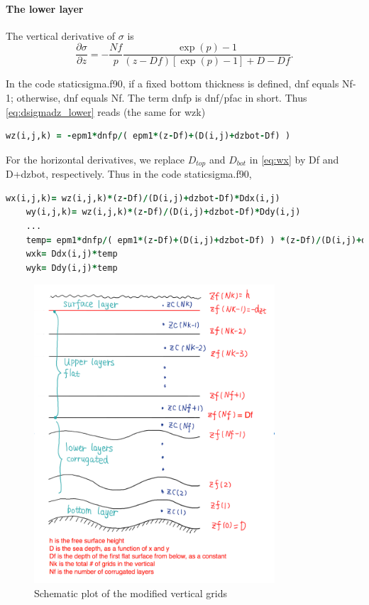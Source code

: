 \documentclass[12pt,letterpaper,titlepage]{article}
\newcommand{\Blue}[1]{{\color{blue}#1}}
\begin{document}
\paragraph{The lower layer}
The vertical derivative of $\sigma$ is
\begin{equation}
\frac{\partial \sigma}{\partial z} =-\frac{Nf}{p}\frac{\exp(p)-1}{(z-Df)[\exp(p)-1]+D-Df}. \label{eq:dsigmadz_lower}
\end{equation}

In the code staticsigma.f90, if a fixed bottom thickness is defined, dnf equals Nf-1; otherwise, dnf equals Nf. The term \Blue{dnfp} is dnf/pfac in short. Thus \eqref{eq:dsigmadz_lower} reads (the same for wzk)
\begin{lstlisting}[language=Fortran, caption=staticsigma.f90 (for the lower layer)]
    wz(i,j,k) = -epm1*dnfp/( epm1*(z-Df)+(D(i,j)+dzbot-Df) )
\end{lstlisting}

For the horizontal derivatives, we replace $D_{top}$ and $D_{bot}$ in \eqref{eq:wx} by Df and D+dzbot, respectively. Thus in the code staticsigma.f90,
\begin{lstlisting}[language=Fortran, caption=staticsigma.f90 (for the lower layer)]
    wx(i,j,k)= wz(i,j,k)*(z-Df)/(D(i,j)+dzbot-Df)*Ddx(i,j)
    wy(i,j,k)= wz(i,j,k)*(z-Df)/(D(i,j)+dzbot-Df)*Ddy(i,j)
    ...
    temp= epm1*dnfp/( epm1*(z-Df)+(D(i,j)+dzbot-Df) ) *(z-Df)/(D(i,j)+dzbot-Df)
    wxk= Ddx(i,j)*temp
    wyk= Ddy(i,j)*temp
\end{lstlisting}

\begin{figure}[hbt]
\centering 
 \includegraphics[width=0.8\textwidth]{grid_modified.png}
 \caption{Schematic plot of the modified vertical grids}
 \label{grid_modified}
\end{figure}
\end{document}
